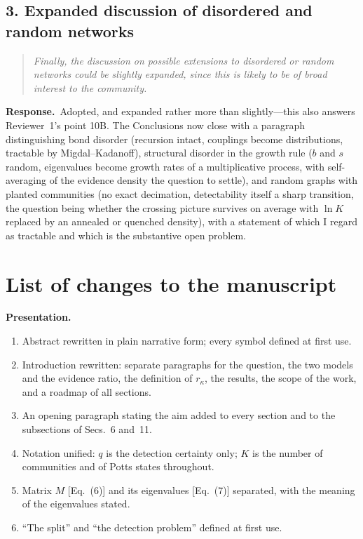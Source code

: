 \documentclass[11pt]{article}
\newcommand{\rk}{r_{\kappa}}
\newenvironment{point}{\begin{quote}\itshape}{\end{quote}}
\newcommand{\reply}{\par\noindent\textbf{Response.}\ }
\begin{document}
\subsection*{3. Expanded discussion of disordered and random networks}

\begin{point}
Finally, the discussion on possible extensions to disordered or random networks
could be slightly expanded, since this is likely to be of broad interest to the
community.
\end{point}

\reply Adopted, and expanded rather more than slightly---this also answers
Reviewer~1's point 10B. The Conclusions now close with a paragraph
distinguishing bond disorder (recursion intact, couplings become distributions,
tractable by Migdal--Kadanoff), structural disorder in the growth rule ($b$ and
$s$ random, eigenvalues become growth rates of a multiplicative process, with
self-averaging of the evidence density the question to settle), and random
graphs with planted communities (no exact decimation, detectability itself a
sharp transition, the question being whether the crossing picture survives on
average with $\ln K$ replaced by an annealed or quenched density), with a
statement of which I regard as tractable and which is the substantive open
problem.

\section*{List of changes to the manuscript}

\textbf{Presentation.}
\begin{enumerate}
\item Abstract rewritten in plain narrative form; every symbol defined at first
      use.
\item Introduction rewritten: separate paragraphs for the question, the two
      models and the evidence ratio, the definition of $\rk$, the results, the
      scope of the work, and a roadmap of all sections.
\item An opening paragraph stating the aim added to every section and to the
      subsections of Secs.~6 and~11.
\item Notation unified: $q$ is the detection certainty only; $K$ is the number
      of communities and of Potts states throughout.
\item Matrix $M$ [Eq.~(6)] and its eigenvalues [Eq.~(7)] separated, with the
      meaning of the eigenvalues stated.
\item ``The split'' and ``the detection problem'' defined at first use.
\end{enumerate}
\end{document}
